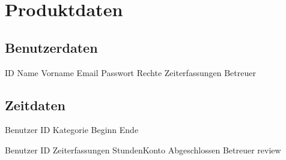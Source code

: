 \section{Produktdaten}

\subsection{Benutzerdaten}
\begin{requirements}
	\begin{requirements}
		 ID
		 Name
		 Vorname
		 Email
		 Passwort
		 Rechte
		 Zeiterfassungen
		 Betreuer
	\end{requirements}
\end{requirements}

\subsection{Zeitdaten}
\begin{requirements}
	\req [Zeiterfassung] {D20}
	\begin{requirements}
		 Benutzer ID
		 Kategorie
		 Beginn
		 Ende
	\end{requirements}

	\req [Stundenzettel] {D30}
	\begin{requirements}
		 Benutzer ID
		 Zeiterfassungen
		 StundenKonto
		 Abgeschlossen
		 Betreuer review
	\end{requirements}
\end{requirements}


